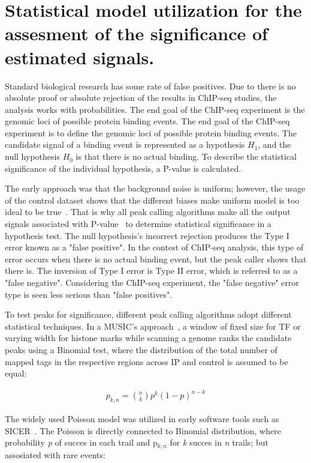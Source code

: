 \section{Statistical model utilization for the assesment of the significance of estimated signals.}


Standard biological research has some rate of false positives. 
Due to there is no absolute proof or absolute rejection of the results in ChIP-seq studies, the analysis works with probabilities.
The end goal of the ChIP-seq experiment is the genomic loci of possible protein binding events. 
The end goal of the ChIP-seq experiment is to define the genomic loci of possible protein binding events. 
The candidate signal of a binding event is represented as a hypothesis $H_{1}$, and the null hypothesis $H_{0}$ is that there is no actual binding. To describe the statistical significance of the individual hypothesis, a P-value is calculated. 

The early approach was that the background noise is uniform; 
however, the usage of the control dataset shows that the different biases make uniform model is too ideal to be true~\cite{robertson2007genome}. 
That is why all peak calling algorithms make all the output signals associated with P-value~\cite{chitpin2019recap} to determine statistical significance in a hypothesis test. 
The null hypothesis's incorrect rejection produces the Type I error known as a "false positive". 
In the contest of ChIP-seq analysis, this type of error occurs when there is no actual binding event, but the peak caller shows that there is. 
The inversion of Type I error is Type II error, which is referred to as a "false negative". Considering the ChIP-seq experiment, the "false negative" error type is seen less serious than "false positives". 

To test peaks for significance, different peak calling algorithms adopt different statistical techniques. 
In a MUSIC's approach~\cite{harmanci2014music}, a window of fixed size for TF or varying width for histone marks while scanning a genome ranks the candidate peaks using a Binomial test, where the distribution of the total number of mapped tags in the respective regions across IP and control is assumed to be equal:

\begin{align*}
    p_{k,n} = \binom{n}{k}p^k(1-p)^{n-k}
\end{align*}

The widely used Poisson model was utilized in early software tools such as SICER~\cite{zang2009clustering}. 
The Poisson is directly connected to Binomial distribution,
where probability \textit{p} of succes in each trail and p$_{k,n}$  for \textit{k} succes in \textit{n} trails; but assosiated with rare events:

